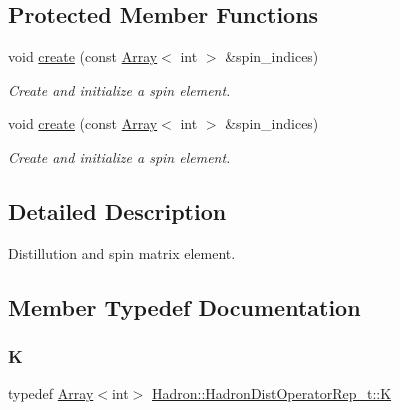 \subsection*{Protected Member Functions}
\begin{DoxyCompactItemize}
\item 
void \mbox{\hyperlink{classHadron_1_1HadronDistOperatorRep__t_a5d71057f500ecb252c0d204434d45ccd}{create}} (const \mbox{\hyperlink{classXMLArray_1_1Array}{Array}}$<$ int $>$ \&spin\+\_\+indices)
\begin{DoxyCompactList}\small\item\em Create and initialize a spin element. \end{DoxyCompactList}\item 
void \mbox{\hyperlink{classHadron_1_1HadronDistOperatorRep__t_a5d71057f500ecb252c0d204434d45ccd}{create}} (const \mbox{\hyperlink{classXMLArray_1_1Array}{Array}}$<$ int $>$ \&spin\+\_\+indices)
\begin{DoxyCompactList}\small\item\em Create and initialize a spin element. \end{DoxyCompactList}\end{DoxyCompactItemize}


\subsection{Detailed Description}
Distillution and spin matrix element. 

\subsection{Member Typedef Documentation}
\mbox{\label{classHadron_1_1HadronDistOperatorRep__t_a670c7409bfd80616aeb0159590bcdb6b}} 
\subsubsection{\texorpdfstring{K}{K}\hspace{0.1cm}{\footnotesize\ttfamily [1/2]}}
{\footnotesize\ttfamily typedef \mbox{\hyperlink{classXMLArray_1_1Array}{Array}}$<$int$>$ \mbox{\hyperlink{classHadron_1_1HadronDistOperatorRep__t_a670c7409bfd80616aeb0159590bcdb6b}{Hadron\+::\+Hadron\+Dist\+Operator\+Rep\+\_\+t\+::K}}}

